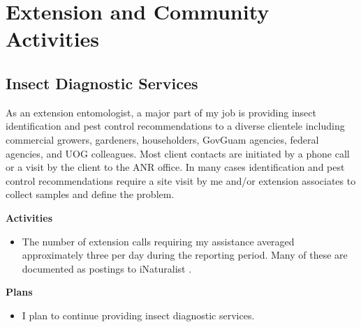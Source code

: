 \documentclass[12pt,english]{scrartcl}
\newcommand{\activities}{\medskip\textbf{Activities}}
\newcommand{\plans}{\medskip\textbf{Plans}}
\begin{document}
\pagebreak

\section{Extension and Community Activities}

\subsection{Insect Diagnostic Services}
\begin{refsection}
	
As an extension entomologist, a major part of my job is providing
insect identification and pest control recommendations to a diverse
clientele including commercial growers, gardeners, householders, GovGuam
agencies, federal agencies, and UOG colleagues. Most client contacts
are initiated by a phone call or a visit by the client to the ANR
office. In many cases identification and pest control recommendations
require a site visit by me and/or extension associates to collect
samples and define the problem.

\activities

\begin{itemize}
\item The number of extension calls requiring my assistance averaged approximately
three per day during the reporting period. Many of these are documented
as postings to iNaturalist \cite{moore_aubrey_2020}.
\end{itemize}

\plans

\begin{itemize}
\item I plan to continue providing insect diagnostic services.
\end{itemize}

\printbibliography

\end{refsection}
\end{document}
